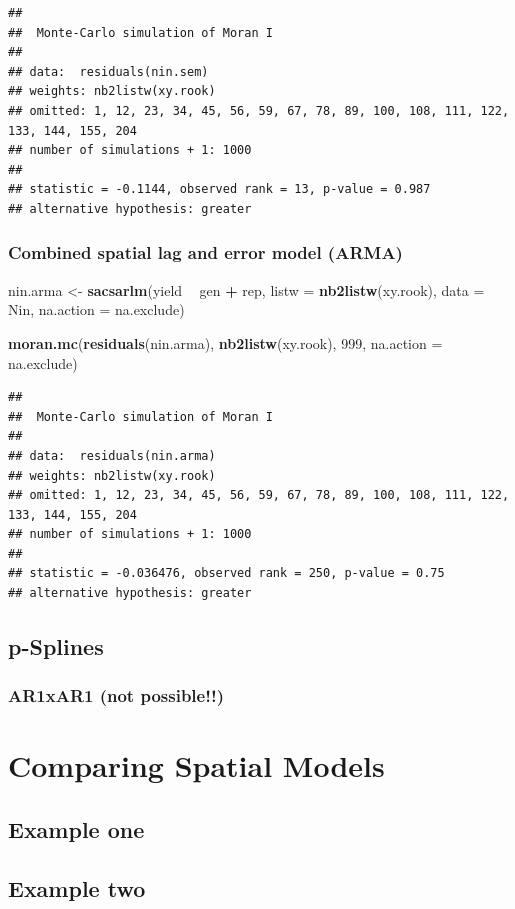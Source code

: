 \documentclass[]{book}
\newenvironment{Shaded}{\begin{snugshade}}{\end{snugshade}}
\newcommand{\DataTypeTok}[1]{\textcolor[rgb]{0.13,0.29,0.53}{#1}}
\newcommand{\DecValTok}[1]{\textcolor[rgb]{0.00,0.00,0.81}{#1}}
\newcommand{\KeywordTok}[1]{\textcolor[rgb]{0.13,0.29,0.53}{\textbf{#1}}}
\newcommand{\NormalTok}[1]{#1}
\newcommand{\OperatorTok}[1]{\textcolor[rgb]{0.81,0.36,0.00}{\textbf{#1}}}
\newcommand{\StringTok}[1]{\textcolor[rgb]{0.31,0.60,0.02}{#1}}
\begin{document}
\begin{verbatim}
## 
##  Monte-Carlo simulation of Moran I
## 
## data:  residuals(nin.sem) 
## weights: nb2listw(xy.rook) 
## omitted: 1, 12, 23, 34, 45, 56, 59, 67, 78, 89, 100, 108, 111, 122, 133, 144, 155, 204 
## number of simulations + 1: 1000 
## 
## statistic = -0.1144, observed rank = 13, p-value = 0.987
## alternative hypothesis: greater
\end{verbatim}

\hypertarget{combined-spatial-lag-and-error-model-arma}{%
\subsection{Combined spatial lag and error model (ARMA)}\label{combined-spatial-lag-and-error-model-arma}}

\begin{Shaded}
\begin{Highlighting}[]
\NormalTok{nin.arma <-}\StringTok{ }\KeywordTok{sacsarlm}\NormalTok{(yield }\OperatorTok{~}\StringTok{ }\NormalTok{gen }\OperatorTok{+}\StringTok{ }\NormalTok{rep,}
                       \DataTypeTok{listw =} \KeywordTok{nb2listw}\NormalTok{(xy.rook),}
                       \DataTypeTok{data =}\NormalTok{ Nin, }\DataTypeTok{na.action =}\NormalTok{ na.exclude)}

\KeywordTok{moran.mc}\NormalTok{(}\KeywordTok{residuals}\NormalTok{(nin.arma), }\KeywordTok{nb2listw}\NormalTok{(xy.rook), }\DecValTok{999}\NormalTok{, }\DataTypeTok{na.action =}\NormalTok{ na.exclude)}
\end{Highlighting}
\end{Shaded}

\begin{verbatim}
## 
##  Monte-Carlo simulation of Moran I
## 
## data:  residuals(nin.arma) 
## weights: nb2listw(xy.rook) 
## omitted: 1, 12, 23, 34, 45, 56, 59, 67, 78, 89, 100, 108, 111, 122, 133, 144, 155, 204 
## number of simulations + 1: 1000 
## 
## statistic = -0.036476, observed rank = 250, p-value = 0.75
## alternative hypothesis: greater
\end{verbatim}

\hypertarget{p-splines}{%
\section{p-Splines}\label{p-splines}}

\hypertarget{ar1xar1-not-possible}{%
\subsection{AR1xAR1 (not possible!!)}\label{ar1xar1-not-possible}}

\hypertarget{ch3-part3}{%
\chapter{Comparing Spatial Models}\label{ch3-part3}}

\hypertarget{example-one}{%
\section{Example one}\label{example-one}}

\hypertarget{example-two}{%
\section{Example two}\label{example-two}}


\end{document}
